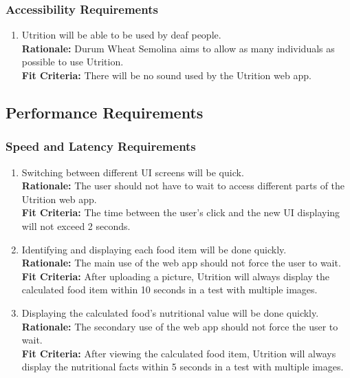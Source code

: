 \documentclass[12pt]{article}
\begin{document}
\subsubsection{Accessibility Requirements}

\begin{enumerate}[{UH}6. ] 
	\item Utrition will be able to be used by deaf people.\\
	\textbf{Rationale:} Durum Wheat Semolina aims to allow as many individuals as possible to use Utrition.\\
	\textbf{Fit Criteria:} There will be no sound used by the Utrition web app. 
\end{enumerate}

\subsection{Performance Requirements}

\subsubsection{Speed and Latency Requirements}

\begin{enumerate}[start=1,label={PR\arabic*.}]
	\item Switching between different UI screens will be quick.\\
	\textbf{Rationale:} The user should not have to wait to access different parts of the Utrition web app.\\
	\textbf{Fit Criteria:} The time between the user’s click and the new UI displaying will not exceed 2 seconds.
	\item Identifying and displaying each food item will be done quickly.\\
	\textbf{Rationale:} The main use of the web app should not force the user to wait.\\
	\textbf{Fit Criteria:} After uploading a picture, Utrition will always display the calculated food item within 10 seconds in a test with multiple images.
	\item Displaying the calculated food’s nutritional value will be done quickly. \\
	\textbf{Rationale:} The secondary use of the web app should not force the user to wait. \\
	\textbf{Fit Criteria:} After viewing the calculated food item, Utrition will always display the nutritional facts within 5 seconds in a test with multiple images.
\end{enumerate}
\end{document}
